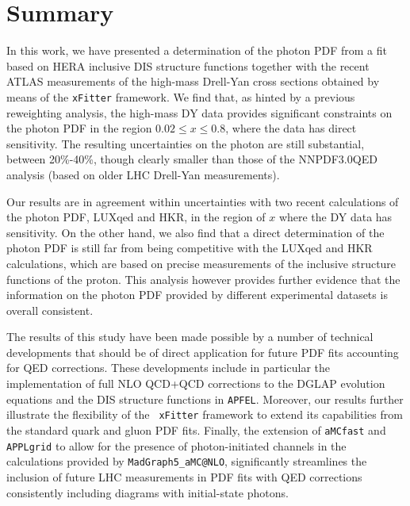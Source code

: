\section{Summary}
\label{sec:conclusions}

%
In this work, we have presented a determination of the photon PDF from
a fit based on HERA inclusive DIS structure functions together with
the recent ATLAS measurements of the high-mass Drell-Yan cross
sections obtained by means of the {\tt xFitter} framework.
%
We find that, as hinted by a previous reweighting analysis, the
high-mass DY data provides significant constraints on the photon PDF
in the region $0.02 \le x \le 0.8$, where the data has direct
sensitivity.
%
The resulting uncertainties on the photon are still substantial,
between 20\%-40\%, though clearly smaller than those of the
NNPDF3.0QED analysis (based on older LHC Drell-Yan measurements).

Our results are in agreement within uncertainties with two recent
calculations of the photon PDF, LUXqed and HKR, in the region of $x$
where the DY data has sensitivity.
%
On the other hand, we also find that a direct determination of the
photon PDF is still far from being competitive with the LUXqed and HKR
calculations, which are based on precise measurements of the inclusive
structure functions of the proton.
%
This analysis however provides further evidence that the information
on the photon PDF provided by different experimental datasets is
overall consistent.

The results of this study have been made possible by a number of
technical developments that should be of direct application for future
PDF fits accounting for QED corrections.
%
These developments include in particular the implementation of full NLO
QCD+QCD corrections to the DGLAP evolution equations and the DIS
structure functions in {\tt APFEL}.
%
Moreover, our results further illustrate the flexibility of the {\tt
  xFitter} framework to extend its capabilities from the standard
quark and gluon PDF fits.
%
Finally, the extension of {\tt aMCfast} and {\tt APPLgrid} to allow
for the presence of photon-initiated channels in the calculations
provided by {\tt MadGraph5\_aMC@NLO}, significantly streamlines the
inclusion of future LHC measurements in PDF fits with QED corrections
consistently including diagrams with initial-state photons.

